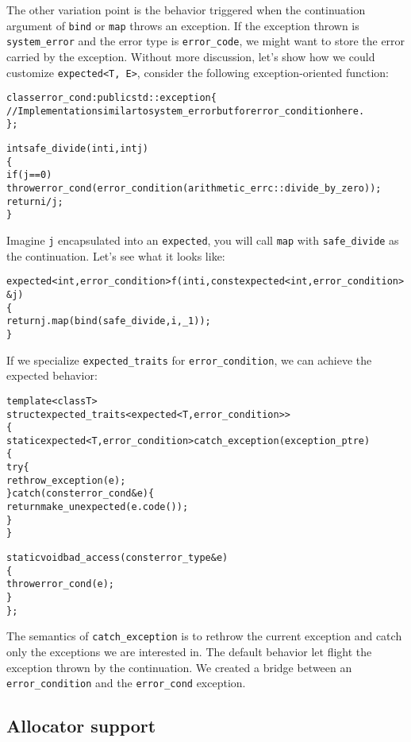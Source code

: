 \documentclass[a4paper,10pt]{article}
\newcommand{\cpp}[1]{\lstinline{#1}}
\begin{document}
The other variation point is the behavior triggered when the continuation argument of \cpp{bind} or \cpp{map} throws an exception. If the exception thrown is \cpp{system_error} and the error type is \cpp{error_code}, we might want to store the error carried by the exception. Without more discussion, let's show how we could customize \cpp{expected<T, E>}, consider the following exception-oriented function:

\begin{alltt}
class error_cond : public std::exception \{
  // Implementation similar to system_error but for error_condition here.
\};

int safe_divide(int i, int j)
\{
  if (j == 0) 
    throw error_cond(error_condition(arithmetic_errc::divide_by_zero));
  return i/j;
\}
\end{alltt}

\noindent
Imagine \cpp{j} encapsulated into an \cpp{expected}, you will call \cpp{map} with \cpp{safe_divide} as the continuation. Let's see what it looks like:

\begin{alltt}
expected<int, error_condition> f(int i, const expected<int, error_condition>& j)
\{
  return j.map(bind(safe_divide, i, _1));
\}
\end{alltt}

\noindent
If we specialize \cpp{expected_traits} for \cpp{error_condition}, we can achieve the expected behavior:

\begin{alltt}
template <class T>
struct expected_traits<expected<T, error_condition>>
\{
  static expected<T, error_condition> catch_exception(exception_ptr e)
  \{
    try\{
      rethrow_exception(e);
    \} catch(const error_cond& e) \{
      return make_unexpected(e.code());
    \}
  \}

  static void bad_access(const error_type &e)
  \{
    throw error_cond(e);
  \}
\};
\end{alltt}

The semantics of \cpp{catch_exception} is to rethrow the current exception and catch only the exceptions we are interested in. The default behavior let flight the exception thrown by the continuation. We created a bridge between an \cpp{error_condition} and the \cpp{error_cond} exception.

\subsection{Allocator support}
\end{document}
